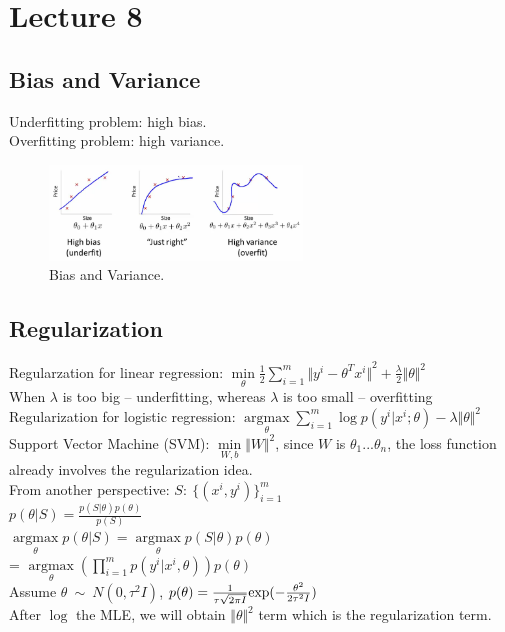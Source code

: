 \documentclass{article}
\begin{document}
\section{Lecture 8}
\subsection{Bias and Variance}
Underfitting problem: high bias.\\
Overfitting problem: high variance.
\begin{figure}[H]
	\centerline{
   \includegraphics[width=0.6\textwidth]{Fig6.png}}
   \caption{Bias and Variance.}
   \label{fig:example}
\end{figure}

\subsection{Regularization}
Regularzation for linear regression: $\min\limits_\theta \frac{1}{2} \sum\limits_{i=1}^m {\Vert y^i-\theta^Tx^i \Vert}^2 + \frac{\lambda}{2}{\Vert \theta \Vert}^2$\\
When $\lambda$ is too big -- underfitting, whereas $\lambda$ is too small -- overfitting\\

\noindent
Regularization for logistic regression: $\mathop{\arg\max}\limits_{\theta} \sum\limits_{i=1}^m\log{p(y^i|x^i;\theta)} - \lambda{\Vert \theta \Vert}^2$\\

\noindent
Support Vector Machine (SVM): $\min\limits_{W,b} {\Vert W \Vert}^2$, since $W$ is $\theta_1 ... \theta_n$, the loss function already involves the regularization idea.\\

\noindent
From another perspective: $S:\ \{(x^i,y^i)\}_{i=1}^m$\\
$p(\theta|S) = \frac{p(S|\theta)p(\theta)}{p(S)}$\\
$\mathop{\arg\max}\limits_{\theta} p(\theta|S) = \mathop{\arg\max}\limits_{\theta} p(S|\theta)p(\theta)$\\
= $\mathop{\arg\max}\limits_{\theta} (\prod\limits_{i=1}^mp(y^i|x^i,\theta))p(\theta)$\\
Assume $\theta\ \sim\ N(0, \tau^2I)$, $p(\theta) = \frac{1}{\tau\sqrt{2 \pi I}}{\rm exp}(-\frac{\theta^2}{2\tau^2I})$\\
After $\log{}$ the MLE, we will obtain ${\Vert \theta \Vert}^2$ term which is the regularization term.\\
\end{document}
